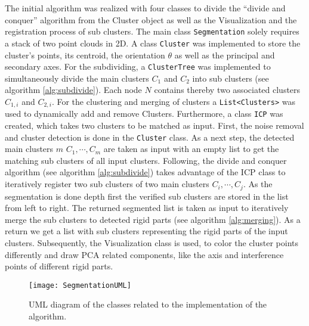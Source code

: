 The initial algorithm was realized with four classes to divide the ``divide and conquer'' algorithm from the Cluster object as well as the Visualization and the registration process of sub clusters.
The main class \texttt{Segmentation} solely requires a stack of two point clouds in 2D.  A class \texttt{Cluster} was implemented to store the cluster's points, its centroid, the orientation $\theta$ as well as the principal and secondary axes. For the subdividing, a \texttt{ClusterTree} was implemented to simultaneously divide the main clusters $C_1$ and $C_2$ into sub clusters (see algorithm \ref{alg:subdivide}). Each node $N$ contains thereby two associated clusters $C_{1,i}$ and $C_{2,i}$. For the clustering and merging of clusters a \texttt{List<Clusters>} was used to dynamically add and remove Clusters. Furthermore, a class \texttt{ICP} was created, which takes two clusters to be matched as input. First, the noise removal and cluster detection is done in the \texttt{Cluster} class. As a next step, the detected main clusters $m$  $C_1,\cdots,C_{m}$ are taken as input with an empty list to get the matching sub clusters of all input clusters. Following, the divide and conquer algorithm (see algorithm \ref{alg:subdivide}) takes advantage of the ICP class to iteratively register two sub clusters of two main clusters $C_{i},\cdots,C_{j}$. As the segmentation is done depth first the verified sub clusters are stored in the list from left to right. The returned segmented list is taken as input to iteratively merge the sub clusters to detected rigid parts (see algorithm \ref{alg:merging}). As a return we get a list with sub clusters representing the rigid parts of the input clusters. Subsequently, the Visualization class is used, to color the cluster points differently and draw PCA related components, like the axis and interference points of different rigid parts.


\begin{figure}
	\centering
	\texttt{[image: SegmentationUML]}
	\caption{UML diagram of the classes related to the implementation of the algorithm.}
	\label{fig:UML}
\end{figure}

